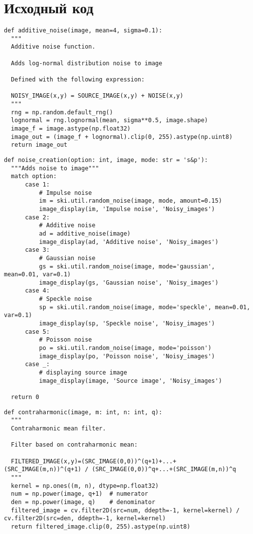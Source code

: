 \documentclass[a4paper, 12pt]{extarticle}
\makeatletter
\renewcommand\tableofcontents{ 
  \begin{singlespace}
    \null\hfill\textbf{\Large\contentsname}\hfill\null\par
    \@mkboth{\MakeUppercase\contentsname}{\MakeUppercase\contentsname}%
    \@starttoc{toc}
  \end{singlespace}
}
\makeatother
\begin{document}

\addtocounter{page}{1} %
\tableofcontents %
\pagebreak


\clearpage
\appendix

\section{Исходный код}

\begin{lstlisting}[style=python_white]
def additive_noise(image, mean=4, sigma=0.1):
  """
  Additive noise function.

  Adds log-normal distribution noise to image

  Defined with the following expression:

  NOISY_IMAGE(x,y) = SOURCE_IMAGE(x,y) + NOISE(x,y)
  """
  rng = np.random.default_rng()
  lognormal = rng.lognormal(mean, sigma**0.5, image.shape)
  image_f = image.astype(np.float32)
  image_out = (image_f + lognormal).clip(0, 255).astype(np.uint8)
  return image_out
\end{lstlisting}

\begin{lstlisting}[style=python_white]
def noise_creation(option: int, image, mode: str = 's&p'):
  """Adds noise to image"""
  match option:
      case 1:
          # Impulse noise
          im = ski.util.random_noise(image, mode, amount=0.15)
          image_display(im, 'Impulse noise', 'Noisy_images')
      case 2:
          # Additive noise
          ad = additive_noise(image)
          image_display(ad, 'Additive noise', 'Noisy_images')
      case 3:
          # Gaussian noise
          gs = ski.util.random_noise(image, mode='gaussian', mean=0.01, var=0.1)
          image_display(gs, 'Gaussian noise', 'Noisy_images')
      case 4:
          # Speckle noise
          sp = ski.util.random_noise(image, mode='speckle', mean=0.01, var=0.1)
          image_display(sp, 'Speckle noise', 'Noisy_images')
      case 5:
          # Poisson noise
          po = ski.util.random_noise(image, mode='poisson')
          image_display(po, 'Poisson noise', 'Noisy_images')
      case _:
          # displaying source image
          image_display(image, 'Source image', 'Noisy_images')

  return 0
\end{lstlisting}

\begin{lstlisting}[style=python_white]
def contraharmonic(image, m: int, n: int, q):
  """
  Contraharmonic mean filter.

  Filter based on contraharmonic mean:

  FILTERED_IMAGE(x,y)=(SRC_IMAGE(0,0))^(q+1)+...+(SRC_IMAGE(m,n))^(q+1) / (SRC_IMAGE(0,0))^q+...+(SRC_IMAGE(m,n))^q
  """
  kernel = np.ones((m, n), dtype=np.float32)
  num = np.power(image, q+1)  # numerator
  den = np.power(image, q)    # denominator
  filtered_image = cv.filter2D(src=num, ddepth=-1, kernel=kernel) / cv.filter2D(src=den, ddepth=-1, kernel=kernel)
  return filtered_image.clip(0, 255).astype(np.uint8)
\end{lstlisting}
\end{document}
